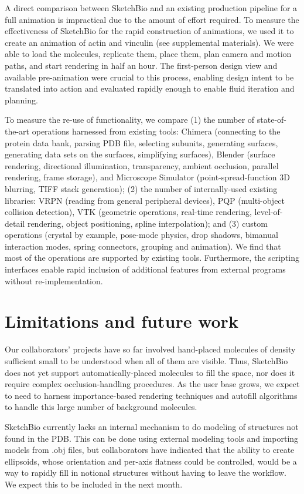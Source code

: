 \documentclass[twocolumn]{bmcart}%
\begin{document}
A direct comparison between SketchBio and an existing production pipeline for a full animation is impractical due to the amount of effort required.  To measure the effectiveness of SketchBio for the rapid construction of animations, we used it to create an animation of actin and vinculin (see supplemental materials).  We were able to load the molecules, replicate them, place them, plan camera and motion paths, and start rendering in half an hour.  The first-person design view and available pre-animation were crucial to this process, enabling design intent to be translated into action and evaluated rapidly enough to enable fluid iteration and planning.

To measure the re-use of functionality, we compare (1) the number of state-of-the-art operations harnessed from existing tools: Chimera (connecting to the protein data bank, parsing PDB file, selecting subunits, generating surfaces, generating data sets on the surfaces, simplifying surfaces), Blender (surface rendering, directional illumination, transparency, ambient occlusion, parallel rendering, frame storage), and Microscope Simulator (point-spread-function 3D blurring, TIFF stack generation); (2) the number of internally-used existing libraries: VRPN (reading from general peripheral devices), PQP (multi-object collision detection), VTK (geometric operations, real-time rendering, level-of-detail rendering, object positioning, spline interpolation); and (3) custom operations (crystal by example, pose-mode physics, drop shadows, bimanual interaction modes, spring connectors, grouping and animation).  We find that most of the operations are supported by existing tools.  Furthermore, the scripting interfaces enable rapid inclusion of additional features from external programs without re-implementation.


\section*{Limitations and future work}
Our collaborators' projects have so far involved hand-placed molecules of density sufficient small to be understood when all of them are visible.  Thus, SketchBio does not yet support automatically-placed molecules to fill the space, nor does it require complex occlusion-handling procedures.  As the user base grows, we expect to need to harness importance-based rendering techniques and autofill algorithms to handle this large number of background molecules.

SketchBio currently lacks an internal mechanism to do modeling of structures not found in the PDB.  This can be done using external modeling tools and importing models from .obj files, but collaborators have indicated that the ability to create ellipsoids, whose orientation and per-axis flatness could be controlled, would be a way to rapidly fill in notional structures without having to leave the workflow.  We expect this to be included in the next month.
\end{document}

